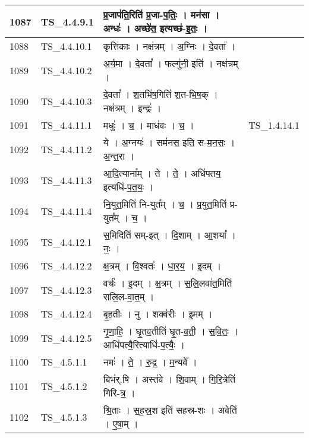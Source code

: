\documentclass[17pt]{extarticle}
\begin{document}
\begin{longtable}{||p{0.4in}||p{0.9in}||p{4.0in}||p{0.9in}||}
        \hline
            1087 & TS\_4.4.9.1 & प्र॒जाप॑ति॒रिति॑ प्र॒जा{-}प॒तिः॒   ।   मन॑सा   ।   अन्धः॑   ।   अच्छे॑त॒ इत्यच्छ॑{-}इ॒तः॒   ।    &      \\
        \hline
            1088 & TS\_4.4.10.1 & कृत्ति॑काः   ।   नक्ष॑त्रम्   ।   अ॒ग्निः   ।   दे॒वता᳚   ।    &      \\
        \hline
            1089 & TS\_4.4.10.2 & अ॒र्य॒मा   ।   दे॒वता᳚   ।   फल्गु॑नी॒ इति॑   ।   नक्ष॑त्रम्   ।    &      \\
        \hline
            1090 & TS\_4.4.10.3 & दे॒वता᳚   ।   श॒तभि॑ष॒गिति॑ श॒त{-}भि॒ष॒क्   ।   नक्ष॑त्रम्   ।   इन्द्रः॑   ।    &      \\
        \hline
            1091 & TS\_4.4.11.1 & मधुः॑   ।   च॒   ।   माध॑वः   ।   च॒   ।    & TS\_1.4.14.1        \\
        \hline
            1092 & TS\_4.4.11.2 & ये   ।   अ॒ग्नयः॑   ।   सम॑नस॒ इति॒ स{-}म॒न॒सः॒   ।   अ॒न्त॒रा   ।    &      \\
        \hline
            1093 & TS\_4.4.11.3 & आ॒दि॒त्याना᳚म्   ।   ते   ।   ते॒   ।   अधि॑पतय॒ इत्यधि॑{-}प॒त॒यः॒   ।    &      \\
        \hline
            1094 & TS\_4.4.11.4 & नि॒युत॒मिति॑ नि{-}युत᳚म्   ।   च॒   ।   प्र॒युत॒मिति॑ प्र{-}युत᳚म्   ।   च॒   ।    &      \\
        \hline
            1095 & TS\_4.4.12.1 & स॒मिदिति॑ सम्{-}इत्   ।   दि॒शाम्   ।   आ॒शया᳚   ।   नः॒   ।    &      \\
        \hline
            1096 & TS\_4.4.12.2 & क्ष॒त्रम्   ।   वि॒श्वतः॑   ।   धा॒र॒य॒   ।   इ॒दम्   ।    &      \\
        \hline
            1097 & TS\_4.4.12.3 & वर्चः॑   ।   इ॒दम्   ।   क्ष॒त्रम्   ।   स॒लि॒लवा॑त॒मिति॑ सलि॒ल{-}वा॒त॒म्   ।    &      \\
        \hline
            1098 & TS\_4.4.12.4 & बृ॒ह॒तीः   ।   नु   ।   शक्व॑रीः   ।   इ॒मम्   ।    &      \\
        \hline
            1099 & TS\_4.4.12.5 & गृ॒णा॒हि॒   ।   घृ॒तव॒तीति॑ घृ॒त{-}व॒ती॒   ।   स॒वि॒तः॒   ।   आधि॑पत्यै॒रित्याधि॑{-}प॒त्यैः॒   ।    &      \\
        \hline
            1100 & TS\_4.5.1.1 & नमः॑   ।   ते॒   ।   रु॒द्र॒   ।   म॒न्यवे᳚   ।    &      \\
        \hline
            1101 & TS\_4.5.1.2 & बिभ॑र्.षि   ।   अस्त॑वे   ।   शि॒वाम्   ।   गि॒रि॒त्रेति॑ गिरि{-}त्र॒   ।    &      \\
        \hline
            1102 & TS\_4.5.1.3 & श्रि॒ताः   ।   स॒ह॒स्र॒श इति॑ सहस्र{-}शः   ।   अवेति॑   ।   ए॒षा॒म्   ।    &      \\

\end{longtable}
\end{document}
